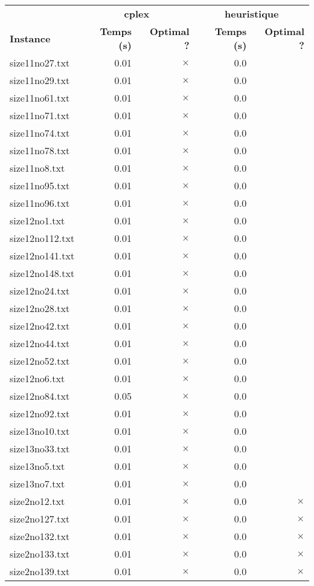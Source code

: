 \documentclass{article}
\begin{document}
\newpage
\begin{center}
\renewcommand{\arraystretch}{1.4} 
 \begin{tabular}{lrrrr}
	\hline
 & \multicolumn{2}{c}{\textbf{cplex}} & \multicolumn{2}{c}{\textbf{heuristique}}\\
\textbf{Instance}  & \textbf{Temps (s)} & \textbf{Optimal ?}  & \textbf{Temps (s)} & \textbf{Optimal ?} \\\hline

size11no27.txt & 0.01 & 
$\times$
 & 0.0 & 
\\
size11no29.txt & 0.01 & 
$\times$
 & 0.0 & 
\\
size11no61.txt & 0.01 & 
$\times$
 & 0.0 & 
\\
size11no71.txt & 0.01 & 
$\times$
 & 0.0 & 
\\
size11no74.txt & 0.01 & 
$\times$
 & 0.0 & 
\\
size11no78.txt & 0.01 & 
$\times$
 & 0.0 & 
\\
size11no8.txt & 0.01 & 
$\times$
 & 0.0 & 
\\
size11no95.txt & 0.01 & 
$\times$
 & 0.0 & 
\\
size11no96.txt & 0.01 & 
$\times$
 & 0.0 & 
\\
size12no1.txt & 0.01 & 
$\times$
 & 0.0 & 
\\
size12no112.txt & 0.01 & 
$\times$
 & 0.0 & 
\\
size12no141.txt & 0.01 & 
$\times$
 & 0.0 & 
\\
size12no148.txt & 0.01 & 
$\times$
 & 0.0 & 
\\
size12no24.txt & 0.01 & 
$\times$
 & 0.0 & 
\\
size12no28.txt & 0.01 & 
$\times$
 & 0.0 & 
\\
size12no42.txt & 0.01 & 
$\times$
 & 0.0 & 
\\
size12no44.txt & 0.01 & 
$\times$
 & 0.0 & 
\\
size12no52.txt & 0.01 & 
$\times$
 & 0.0 & 
\\
size12no6.txt & 0.01 & 
$\times$
 & 0.0 & 
\\
size12no84.txt & 0.05 & 
$\times$
 & 0.0 & 
\\
size12no92.txt & 0.01 & 
$\times$
 & 0.0 & 
\\
size13no10.txt & 0.01 & 
$\times$
 & 0.0 & 
\\
size13no33.txt & 0.01 & 
$\times$
 & 0.0 & 
\\
size13no5.txt & 0.01 & 
$\times$
 & 0.0 & 
\\
size13no7.txt & 0.01 & 
$\times$
 & 0.0 & 
\\
size2no12.txt & 0.01 & 
$\times$
 & 0.0 & 
$\times$
\\
size2no127.txt & 0.01 & 
$\times$
 & 0.0 & 
$\times$
\\
size2no132.txt & 0.01 & 
$\times$
 & 0.0 & 
$\times$
\\
size2no133.txt & 0.01 & 
$\times$
 & 0.0 & 
$\times$
\\
size2no139.txt & 0.01 & 
$\times$
 & 0.0 & 
$\times$
\\
\hline\end{tabular}
\end{center}
\end{document}
